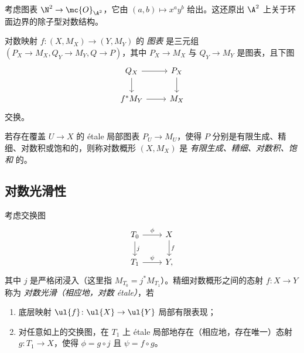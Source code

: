 \begin{exm}
    考虑图表 \(\N^2 \to \mc{O}_{\A^2}\)，它由 \((a,b) \mapsto x^a y^b\) 给出。这还原出 \(\A^2\) 上关于环面边界的除子型对数结构。   
\end{exm}

\begin{defn}
    对数映射 \(f \colon (X, M_X) \to (Y, M_Y)\) 的 \textit{图表} 是三元组 \((P_X\to M_X, Q_Y \to M_Y, Q \to P)\)，其中 \(P_X \to M_X\) 与 \(Q_Y \to M_Y\) 是图表，且下图
    \begin{equation*}
    \begin{tikzcd}
        Q_X \ar{r} \ar{d} & P_X \ar{d} \\
        f^* M_Y \ar{r} & M_X
    \end{tikzcd}
    \end{equation*}
    交换。
\end{defn}

\begin{defn}
    若存在覆盖 \(U \to X\) 的 \'etale 局部图表 \(P_U \to M_U\)，使得 \(P\) 分别是有限生成、精细、对数积或饱和的，则称对数概形 \((X, M_X)\) 是 \textit{有限生成、精细、对数积、饱和} 的。
\end{defn}

\subsection{对数光滑性}%
\label{sub:Log smoothness}

\begin{defn}
    考虑交换图
    \begin{equation*}
    \begin{tikzcd}
        T_0 \ar{r}{\phi} \ar{d}{j} & X \ar{d}{f} \\
        T_1 \ar{r}{\psi} & Y,
    \end{tikzcd}
    \end{equation*}
    其中 \(j\) 是严格闭浸入（这里指 \(M_{T_0} = j^* M_{T_1}\)）。精细对数概形之间的态射 \(f \colon X \to Y\) 称为 \textit{对数光滑（相应地，对数 \'etale）}，若
    \begin{enumerate}
        \item 底层映射 \(\ul{f} \colon \ul{X} \to \ul{Y}\) 局部有限表现；
        \item 对任意如上的交换图，在 \(T_1\) 上 \'etale 局部地存在（相应地，存在唯一）态射 \(g \colon T_1 \to X\)，使得 \(\phi = g \circ j\) 且 \(\psi = f \circ g\)。
    \end{enumerate}
\end{defn}

